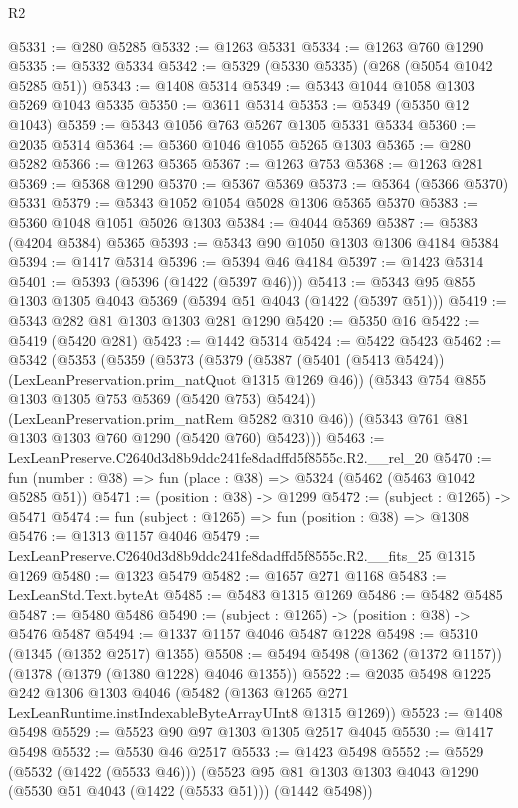 \begin{lexlean}{R2}
\begin{coremodule}
@5331 := @280 @5285
@5332 := @1263 @5331
@5334 := @1263 @760 @1290
@5335 := @5332 @5334
@5342 := @5329 (@5330 @5335) (@268 (@5054 @1042 @5285 @51))
@5343 := @1408 @5314
@5349 := @5343 @1044 @1058 @1303 @5269 @1043 @5335
@5350 := @3611 @5314
@5353 := @5349 (@5350 @12 @1043)
@5359 := @5343 @1056 @763 @5267 @1305 @5331 @5334
@5360 := @2035 @5314
@5364 := @5360 @1046 @1055 @5265 @1303
@5365 := @280 @5282
@5366 := @1263 @5365
@5367 := @1263 @753
@5368 := @1263 @281
@5369 := @5368 @1290
@5370 := @5367 @5369
@5373 := @5364 (@5366 @5370) @5331
@5379 := @5343 @1052 @1054 @5028 @1306 @5365 @5370
@5383 := @5360 @1048 @1051 @5026 @1303
@5384 := @4044 @5369
@5387 := @5383 (@4204 @5384) @5365
@5393 := @5343 @90 @1050 @1303 @1306 @4184 @5384
@5394 := @1417 @5314
@5396 := @5394 @46 @4184
@5397 := @1423 @5314
@5401 := @5393 (@5396 (@1422 (@5397 @46)))
@5413 := @5343 @95 @855 @1303 @1305 @4043 @5369 (@5394 @51 @4043 (@1422 (@5397 @51)))
@5419 := @5343 @282 @81 @1303 @1303 @281 @1290
@5420 := @5350 @16
@5422 := @5419 (@5420 @281)
@5423 := @1442 @5314
@5424 := @5422 @5423
@5462 := @5342
    (@5353
      (@5359
        (@5373
          (@5379
            (@5387 (@5401 (@5413 @5424)) (LexLeanPreservation.prim_natQuot @1315 @1269 @46))
            (@5343 @754 @855 @1303 @1305 @753 @5369 (@5420 @753) @5424))
          (LexLeanPreservation.prim_natRem @5282 @310 @46))
        (@5343 @761 @81 @1303 @1303 @760 @1290 (@5420 @760) @5423)))
@5463 := LexLeanPreserve.C2640d3d8b9ddc241fe8dadffd5f8555c.R2.__rel_20
@5470 := fun (number : @38) => fun (place : @38) => @5324 (@5462 (@5463 @1042 @5285 @51))
@5471 := (position : @38) -> @1299
@5472 := (subject : @1265) -> @5471
@5474 := fun (subject : @1265) => fun (position : @38) => @1308
@5476 := @1313 @1157 @4046
@5479 := LexLeanPreserve.C2640d3d8b9ddc241fe8dadffd5f8555c.R2.__fits_25 @1315 @1269
@5480 := @1323 @5479
@5482 := @1657 @271 @1168
@5483 := LexLeanStd.Text.byteAt
@5485 := @5483 @1315 @1269
@5486 := @5482 @5485
@5487 := @5480 @5486
@5490 := (subject : @1265) -> (position : @38) -> @5476 @5487
@5494 := @1337 @1157 @4046 @5487 @1228
@5498 := @5310 (@1345 (@1352 @2517) @1355)
@5508 := @5494 @5498 (@1362 (@1372 @1157)) (@1378 (@1379 (@1380 @1228) @4046 @1355))
@5522 := @2035
    @5498
    @1225
    @242
    @1306
    @1303
    @4046
    (@5482 (@1363 @1265 @271 LexLeanRuntime.instIndexableByteArrayUInt8 @1315 @1269))
@5523 := @1408 @5498
@5529 := @5523 @90 @97 @1303 @1305 @2517 @4045
@5530 := @1417 @5498
@5532 := @5530 @46 @2517
@5533 := @1423 @5498
@5552 := @5529
    (@5532 (@1422 (@5533 @46)))
    (@5523 @95 @81 @1303 @1303 @4043 @1290 (@5530 @51 @4043 (@1422 (@5533 @51))) (@1442 @5498))

\end{coremodule}
\end{lexlean}
